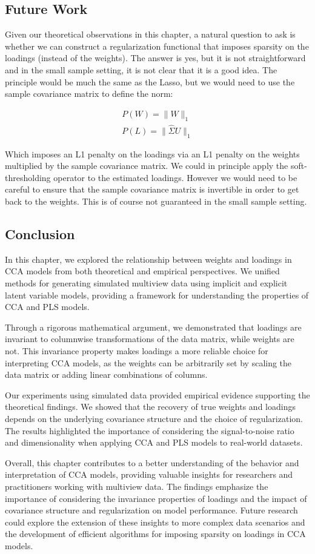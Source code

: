 \subsection{Future Work}

Given our theoretical observations in this chapter, a natural question to ask is whether we can construct a regularization functional that imposes sparsity on the \gls{loadings} (instead of the weights).
The answer is yes, but it is not straightforward and in the small sample setting, it is not clear that it is a good idea.
The principle would be much the same as the Lasso, but we would need to use the sample covariance matrix to define the norm:

\begin{align}
    P(W)=\|W\|_1 \\
    P(L)=\|\hat{\Sigma}U\|_1
\end{align}

Which imposes an L1 penalty on the \gls{loadings} via an L1 penalty on the \gls{weights} multiplied by the sample covariance matrix.
We could in principle apply the soft-thresholding operator to the estimated loadings.
However we would need to be careful to ensure that the sample covariance matrix is invertible in order to get back to the weights.
This is of course not guaranteed in the small sample setting.

\subsection{Conclusion}

In this chapter, we explored the relationship between weights and loadings in CCA models from both theoretical and empirical perspectives. We unified methods for generating simulated multiview data using implicit and explicit latent variable models, providing a framework for understanding the properties of CCA and PLS models.

Through a rigorous mathematical argument, we demonstrated that loadings are invariant to columnwise transformations of the data matrix, while weights are not. This invariance property makes loadings a more reliable choice for interpreting CCA models, as the weights can be arbitrarily set by scaling the data matrix or adding linear combinations of columns.

Our experiments using simulated data provided empirical evidence supporting the theoretical findings. We showed that the recovery of true weights and loadings depends on the underlying covariance structure and the choice of regularization. The results highlighted the importance of considering the signal-to-noise ratio and dimensionality when applying CCA and PLS models to real-world datasets.

Overall, this chapter contributes to a better understanding of the behavior and interpretation of CCA models, providing valuable insights for researchers and practitioners working with multiview data. The findings emphasize the importance of considering the invariance properties of loadings and the impact of covariance structure and regularization on model performance. Future research could explore the extension of these insights to more complex data scenarios and the development of efficient algorithms for imposing sparsity on loadings in CCA models.